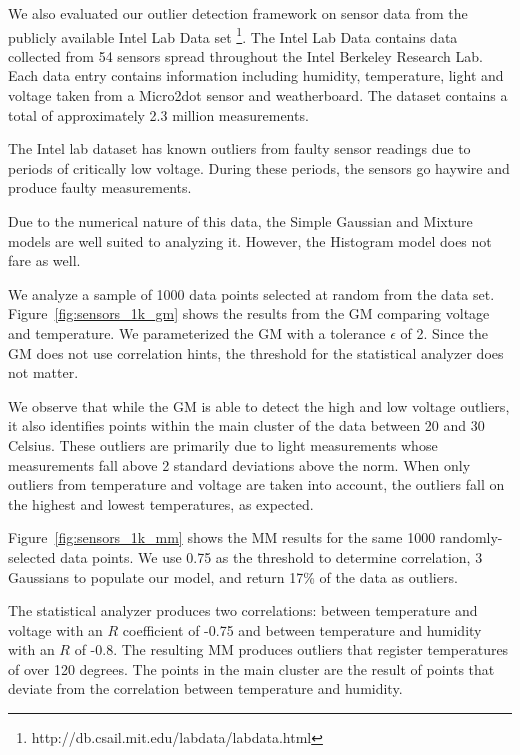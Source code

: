 
We also evaluated our outlier detection framework on sensor data from the publicly available Intel Lab Data set \footnote{http://db.csail.mit.edu/labdata/labdata.html}. The Intel Lab Data contains data collected from 54 sensors spread throughout the Intel Berkeley Research Lab. Each data entry contains information including humidity, temperature, light and voltage taken from a Micro2dot sensor and weatherboard. The dataset contains a total of approximately 2.3 million measurements.

The Intel lab dataset has known outliers from faulty sensor readings due to periods of critically low voltage.
During these periods, the sensors go haywire and produce faulty measurements.

Due to the numerical nature of this data, the Simple Gaussian and Mixture models are well suited to analyzing it. However, the Histogram model does not fare as well.

We analyze a sample of 1000 data points selected at random from the data set. Figure~\ref{fig:sensors_1k_gm} shows the results from the GM comparing voltage and temperature.
We parameterized the GM with a tolerance $\epsilon$ of 2.
Since the GM does not use correlation hints, the threshold for the statistical analyzer does not matter.

We observe that while the GM is able to detect the high and low voltage outliers, it also identifies points within the main cluster of the data between 20 and 30 Celsius.
These outliers are primarily due to light measurements whose measurements fall above 2 standard deviations above the norm.
When only outliers from temperature and voltage are taken into account, the outliers fall on the highest and lowest temperatures, as expected.

Figure~\ref{fig:sensors_1k_mm} shows the MM results for the same 1000 randomly-selected data points.
We use 0.75 as the threshold to determine correlation, 3 Gaussians to populate our model, and return 17\% of the data as outliers.

The statistical analyzer produces two correlations: between temperature and voltage with an $R$ coefficient of -0.75 and between temperature and humidity with an $R$ of -0.8.
The resulting MM produces outliers that register temperatures of over 120 degrees.
The points in the main cluster are the result of points that deviate from the correlation between temperature and humidity.

